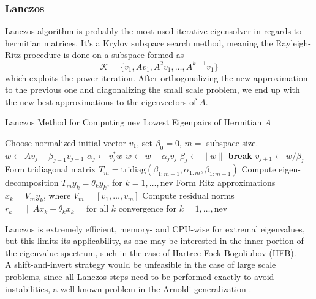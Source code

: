 \subsubsection{Lanczos}
Lanczos algorithm \cite{lanczos1952solution} is probably the most used iterative eigensolver in regards to hermitian matrices. It's a Krylov subspace search method, meaning the Rayleigh-Ritz procedure is done on a subspace formed as 
\begin{equation}
    \mathcal K = \{ v_1, Av_1, A^2 v_1, \ldots, A^{k-1} v_1 \}
\end{equation}
which exploits the power iteration. After orthogonalizing the new approximation to the previous one and diagonalizing the small scale problem, we end up with the new best approximations to the eigenvectors of $A$.
\begin{algorithm}[H]
\caption{Lanczos Method for Computing nev Lowest Eigenpairs of Hermitian $A$}
\begin{algorithmic}[1]
\STATE Choose normalized initial vector $v_1$, set $\beta_0 = 0$, $m=$ subspace size.
\REPEAT
{}
    \STATE $w \gets A v_j - \beta_{j-1} v_{j-1}$
    \STATE $\alpha_j \gets v_j^* w$
    \STATE $w \gets w - \alpha_j v_j$
    \STATE $\beta_j \gets \|w\|$
        \STATE \textbf{break}
    \ENDIF
    \STATE $v_{j+1} \gets w / \beta_j$
\ENDFOR
\STATE Form tridiagonal matrix 
       $T_m = \mathrm{tridiag}(\beta_{1:m-1}, \alpha_{1:m}, \beta_{1:m-1})$
\STATE Compute eigen-decomposition $T_m y_k = \theta_k y_k$, 
       for $k = 1, \dots, \text{nev}$
\STATE Form Ritz approximations 
       $x_k = V_m y_k$, where $V_m = [v_1, \dots, v_m]$
\STATE Compute residual norms 
       $r_k = \|A x_k - \theta_k x_k\|$ for all $k$
\UNTIL convergence for $k = 1, \dots, \text{nev}$
\end{algorithmic}
\end{algorithm}
Lanczos is extremely efficient, memory- and CPU-wise for extremal eigenvalues, but this limits its applicability, as one may be interested in the inner portion of the eigenvalue spectrum, such in the case of Hartree-Fock-Bogoliubov (HFB).
\\A shift-and-invert strategy would be unfeasible in the case of large scale problems, since all Lanczos steps need to be performed exactly to avoid instabilities, a well known problem in the Arnoldi generalization \cite{Saad1992}.
